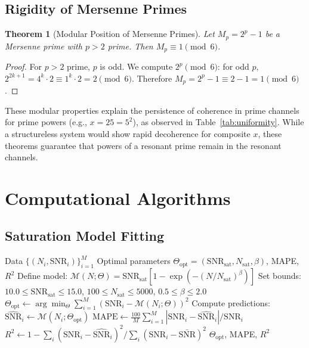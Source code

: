 \documentclass[12pt,a4paper]{article}
\theoremstyle{plain}
\newtheorem{theorem}{Theorem}[section]
\theoremstyle{definition}
\theoremstyle{remark}
\begin{document}
\subsection{Rigidity of Mersenne Primes}

\begin{theorem}[Modular Position of Mersenne Primes]
\label{thm:mersenne}
Let \(M_p = 2^p - 1\) be a Mersenne prime with \(p > 2\) prime. Then \(M_p \equiv 1 \pmod{6}\).
\end{theorem}

\begin{proof}
For \(p > 2\) prime, \(p\) is odd. We compute \(2^p \pmod{6}\): for odd \(p\), \(2^{2k+1} = 4^k \cdot 2 \equiv 1^k \cdot 2 = 2 \pmod{6}\). Therefore \(M_p = 2^p - 1 \equiv 2 - 1 = 1 \pmod{6}\).
\end{proof}

These modular properties explain the persistence of coherence in prime channels for prime powers (e.g., \(x=25=5^2\)), as observed in Table~\ref{tab:uniformity}. While a structureless system would show rapid decoherence for composite \(x\), these theorems guarantee that powers of a resonant prime remain in the resonant channels.

\section{Computational Algorithms}
\label{app:algorithms}

\subsection{Saturation Model Fitting}

\begin{algorithm}[H]
\caption{Robust Fitting of SNR Dynamics}
\label{alg:fit}
\begin{algorithmic}[1]
\Require Data \(\{(N_i, \mathrm{SNR}_i)\}_{i=1}^M\)
\Ensure Optimal parameters \(\Theta_{\text{opt}} = (\mathrm{SNR}_{\text{sat}}, N_{\text{sat}}, \beta)\), MAPE, \(R^2\)
\State Define model: \(\mathcal{M}(N; \Theta) = \mathrm{SNR}_{\text{sat}} [1 - \exp(-(N/N_{\text{sat}})^\beta)]\)
\State Set bounds: \(10.0 \leq \mathrm{SNR}_{\text{sat}} \leq 15.0\), \(100 \leq N_{\text{sat}} \leq 5000\), \(0.5 \leq \beta \leq 2.0\)
\State \(\Theta_{\text{opt}} \gets \arg\min_{\Theta} \sum_{i=1}^M (\mathrm{SNR}_i - \mathcal{M}(N_i; \Theta))^2\) 
\State Compute predictions: \(\widehat{\mathrm{SNR}}_i \gets \mathcal{M}(N_i; \Theta_{\text{opt}})\)
\State \(\mathrm{MAPE} \gets \frac{100}{M} \sum_{i=1}^M |\mathrm{SNR}_i - \widehat{\mathrm{SNR}}_i| / \mathrm{SNR}_i\)
\State \(R^2 \gets 1 - \sum_i (\mathrm{SNR}_i - \widehat{\mathrm{SNR}}_i)^2 / \sum_i (\mathrm{SNR}_i - \bar{\mathrm{SNR}})^2\)
\State \Return \(\Theta_{\text{opt}}\), MAPE, \(R^2\)
\end{algorithmic}
\end{algorithm}
\end{document}
